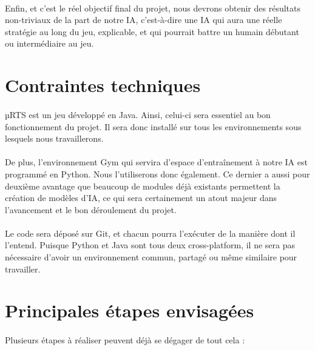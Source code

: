 \documentclass[french]{article}
\begin{document}
		\paragraph*{}
		Enfin, et c'est le réel objectif final du projet, nous devrons obtenir des résultats non-triviaux de la part de notre IA, c'est-à-dire une IA qui aura une réelle stratégie au long du jeu, explicable, et qui pourrait battre un humain débutant ou intermédiaire au jeu.
	
	
	\section{Contraintes techniques}
		\paragraph*{}
		µRTS est un jeu développé en Java. Ainsi, celui-ci sera essentiel au bon fonctionnement du projet. Il sera donc installé sur tous les environnements sous lesquels nous travaillerons.
		
		\paragraph*{}
		De plus, l'environnement Gym qui servira d'espace d'entraînement à notre IA est programmé en Python. Nous l'utiliserons donc également. Ce dernier a aussi pour deuxième avantage que beaucoup de modules déjà existants permettent la création de modèles d'IA, ce qui sera certainement un atout majeur dans l'avancement et le bon déroulement du projet.
		
		\paragraph*{}
		Le code sera déposé sur Git, et chacun pourra l'exécuter de la manière dont il l'entend. Puisque Python et Java sont tous deux cross-platform, il ne sera pas nécessaire d'avoir un environnement commun, partagé ou même similaire pour travailler.
		
	
	\section{Principales étapes envisagées}
		\paragraph*{}
		Plusieurs étapes à réaliser peuvent déjà se dégager de tout cela :
		\vspace{2mm}
		
\end{document}
